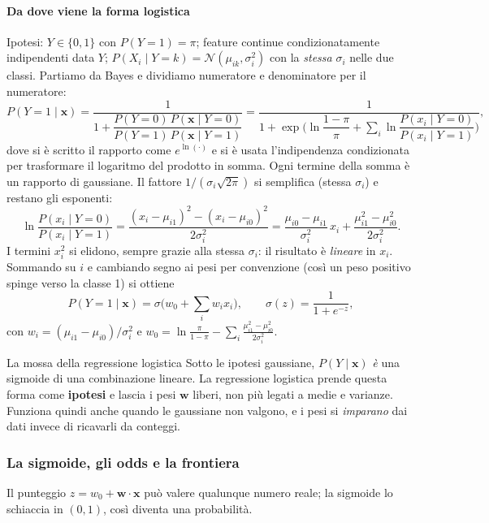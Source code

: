\documentclass[12pt]{extarticle}
\begin{document}
\paragraph{Da dove viene la forma logistica}
Ipotesi: $Y\in\{0,1\}$ con $P(Y{=}1)=\pi$; feature continue condizionatamente indipendenti data $Y$; $P(X_i\mid Y{=}k)=\mathcal{N}(\mu_{ik},\sigma_i^2)$ con la \emph{stessa} $\sigma_i$ nelle due classi. Partiamo da Bayes e dividiamo numeratore e denominatore per il numeratore:
\[
P(Y{=}1\mid\mathbf{x})
=\frac{1}{1+\dfrac{P(Y{=}0)\,P(\mathbf{x}\mid Y{=}0)}{P(Y{=}1)\,P(\mathbf{x}\mid Y{=}1)}}
=\frac{1}{1+\exp\!\Big(\ln\dfrac{1-\pi}{\pi}+\sum_i\ln\dfrac{P(x_i\mid Y{=}0)}{P(x_i\mid Y{=}1)}\Big)},
\]
dove si è scritto il rapporto come $e^{\ln(\cdot)}$ e si è usata l'indipendenza condizionata per trasformare il logaritmo del prodotto in somma. Ogni termine della somma è un rapporto di gaussiane. Il fattore $1/(\sigma_i\sqrt{2\pi})$ si semplifica (stessa $\sigma_i$) e restano gli esponenti:
\[
\ln\frac{P(x_i\mid Y{=}0)}{P(x_i\mid Y{=}1)}
=\frac{(x_i-\mu_{i1})^2-(x_i-\mu_{i0})^2}{2\sigma_i^2}
=\frac{\mu_{i0}-\mu_{i1}}{\sigma_i^2}\,x_i+\frac{\mu_{i1}^2-\mu_{i0}^2}{2\sigma_i^2}.
\]
I termini $x_i^2$ si elidono, sempre grazie alla stessa $\sigma_i$: il risultato è \emph{lineare} in $x_i$. Sommando su $i$ e cambiando segno ai pesi per convenzione (così un peso positivo spinge verso la classe 1) si ottiene
\[
P(Y{=}1\mid\mathbf{x})=\sigma\big(w_0+\textstyle\sum_i w_i x_i\big),
\qquad
\sigma(z)=\frac{1}{1+e^{-z}},
\]
con $w_i=(\mu_{i1}-\mu_{i0})/\sigma_i^2$ e $w_0=\ln\frac{\pi}{1-\pi}-\sum_i\frac{\mu_{i1}^2-\mu_{i0}^2}{2\sigma_i^2}$.

\begin{ideabox}{La mossa della regressione logistica}
Sotto le ipotesi gaussiane, $P(Y\mid\mathbf{x})$ \emph{è} una sigmoide di una combinazione lineare. La regressione logistica prende questa forma come \textbf{ipotesi} e lascia i pesi $\mathbf{w}$ liberi, non più legati a medie e varianze. Funziona quindi anche quando le gaussiane non valgono, e i pesi si \emph{imparano} dai dati invece di ricavarli da conteggi.
\end{ideabox}

\subsubsection{La sigmoide, gli odds e la frontiera}

\noindent Il punteggio $z=w_0+\mathbf{w}\cdot\mathbf{x}$ può valere qualunque numero reale; la sigmoide lo schiaccia in $(0,1)$, così diventa una probabilità.
\end{document}
